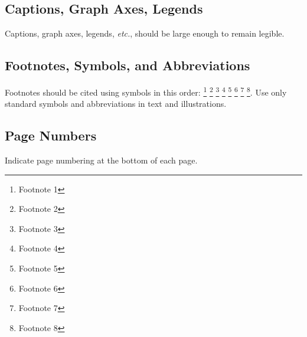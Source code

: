 \documentclass[]{iac}
\begin{document}
\subsection{Captions, Graph Axes, Legends}
Captions, graph axes, legends, \textit{etc.}, should be large enough to remain legible.

\subsection{Footnotes, Symbols, and Abbreviations}
Footnotes should be cited using symbols in this order: \footnote{Footnote 1} \footnote{Footnote 2} \footnote{Footnote 3} \footnote{Footnote 4} \footnote{Footnote 5} \footnote{Footnote 6} \footnote{Footnote 7} \footnote{Footnote 8}. Use only standard symbols and abbreviations in text and illustrations.

\subsection{Page Numbers}
Indicate page numbering at the bottom of each page.
\end{document}
